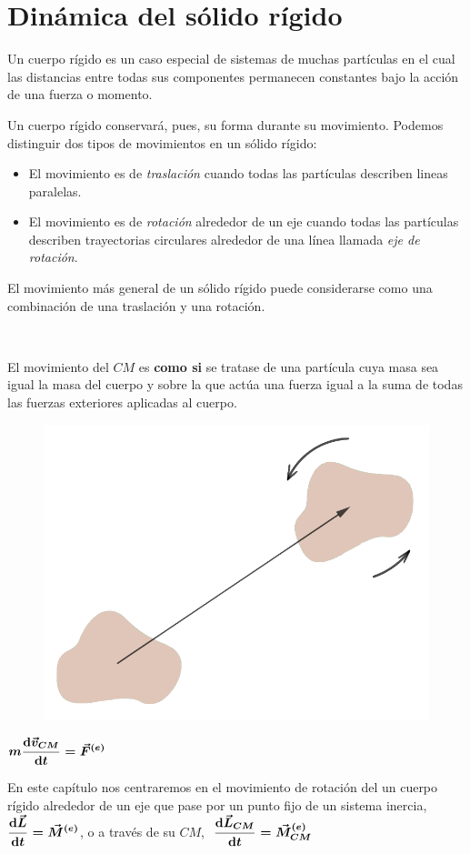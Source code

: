 \chapter{Dinámica del sólido rígido}

\begin{miparrafo}
	Un cuerpo rígido es un caso especial de sistemas de muchas partículas en el cual las distancias entre todas sus componentes permanecen constantes bajo la acción de una fuerza o momento.
	
	Un cuerpo rígido conservará, pues, su forma durante su movimiento. Podemos distinguir dos tipos de movimientos en un sólido rígido:
	
	\begin{itemize}
		\item El movimiento es de \emph{traslación} cuando todas las partículas describen lineas paralelas.
		\item El movimiento es de \emph{rotación} alrededor de un eje cuando todas las partículas describen trayectorias circulares alrededor de una línea llamada \emph{eje de rotación}.	
	\end{itemize}
	
	El movimiento más general de un sólido rígido puede considerarse como una combinación de una traslación y una rotación.

\begin{multicols}{2}
$\quad$ 

El movimiento del $CM$ es \textbf{como si} se tratase de una partícula cuya masa sea igual la masa del cuerpo y sobre la que actúa una fuerza igual a la suma de todas las fuerzas exteriores aplicadas al cuerpo.
\begin{figure}[H]
	\centering
	\includegraphics[width=.5\textwidth]{imagenes/imagenes16/T16IM01.png}
\end{figure}
\end{multicols}

$\boldsymbol{ \displaystyle m\dv{\vec v_{CM}}{t}=\vec F^{(e)} }$

En este capítulo nos centraremos en el movimiento de rotación del un cuerpo rígido alrededor de un eje que pase por un punto fijo de un sistema inercia, 
$\displaystyle \boldsymbol{\dv{\vec L}{t}=\vec M^{(e)}}$, o a través de su $CM$, $\ \displaystyle \boldsymbol{\dv{\vec L_{CM}}{t}=\vec M_{CM}^{(e)}}$
\end{miparrafo}

